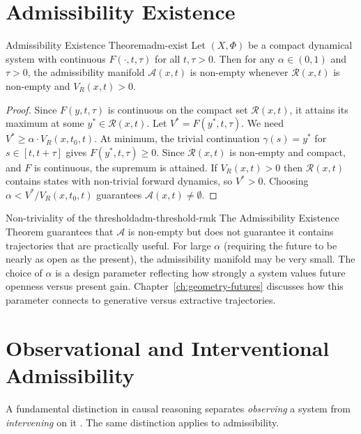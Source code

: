 \documentclass[12pt,twoside,openright]{book}
\newcommand{\reach}{\mathcal{R}}
\newcommand{\adm}{\mathcal{A}}
\begin{document}
\section{Admissibility Existence}
\label{sec:ch14-existence}

\begin{theorem}{Admissibility Existence Theorem}{adm-exist}
  Let $(X,\Phi)$ be a compact dynamical system with
  continuous $F(\cdot,t,\tau)$ for all $t,\tau>0$. Then for
  any $\alpha\in(0,1)$ and $\tau>0$, the admissibility
  manifold $\adm(x,t)$ is non-empty whenever $\reach(x,t)$
  is non-empty and $V_R(x,t)>0$.
\end{theorem}

\begin{proof}
  Since $F(y,t,\tau)$ is continuous on the compact set
  $\reach(x,t)$, it attains its maximum at some
  $y^*\in\reach(x,t)$. Let $V^* = F(y^*,t,\tau)$. We need
  $V^* \ge \alpha\cdot V_R(x,t_0,t)$. At minimum, the
  trivial continuation $\gamma(s)=y^*$ for
  $s\in[t,t+\tau]$ gives $F(y^*,t,\tau)\ge0$. Since
  $\reach(x,t)$ is non-empty and compact, and $F$ is
  continuous, the supremum is attained. If $V_R(x,t)>0$
  then $\reach(x,t)$ contains states with non-trivial
  forward dynamics, so $V^*>0$. Choosing
  $\alpha < V^*/V_R(x,t_0,t)$ guarantees
  $\adm(x,t)\ne\emptyset$.
\end{proof}

\begin{remark}{Non-triviality of the threshold}{adm-threshold-rmk}
  The Admissibility Existence Theorem guarantees that
  $\adm$ is non-empty but does not guarantee it contains
  trajectories that are practically useful. For large
  $\alpha$ (requiring the future to be nearly as open as
  the present), the admissibility manifold may be very
  small. The choice of $\alpha$ is a design parameter
  reflecting how strongly a system values future openness
  versus present gain. Chapter~\ref{ch:geometry-futures}
  discusses how this parameter connects to generative
  versus extractive trajectories.
\end{remark}

\section{Observational and Interventional Admissibility}
\label{sec:ch14-obs-int}

A fundamental distinction in causal reasoning separates
\emph{observing} a system from \emph{intervening} on it
\parencite{pearl2000causality}. The same distinction
applies to admissibility.
\end{document}
